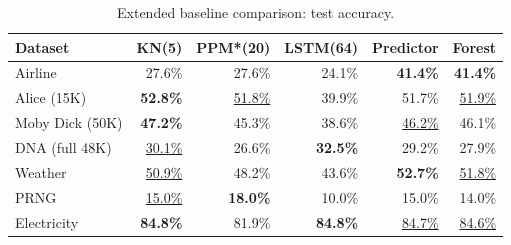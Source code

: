 \begin{table}[h]
\centering
\caption{Extended baseline comparison: test accuracy.}
\label{tab:extended}
\begin{tabular}{lrrrrr}
\toprule
Dataset & KN(5) & PPM*(20) & LSTM(64) & Predictor & Forest \\
\midrule
Airline & 27.6\% & 27.6\% & 24.1\% & \textbf{41.4\%} & \textbf{41.4\%} \\
Alice (15K) & \textbf{52.8\%} & \underline{51.8\%} & 39.9\% & 51.7\% & \underline{51.9\%} \\
Moby Dick (50K) & \textbf{47.2\%} & 45.3\% & 38.6\% & \underline{46.2\%} & 46.1\% \\
DNA (full 48K) & \underline{30.1\%} & 26.6\% & \textbf{32.5\%} & 29.2\% & 27.9\% \\
Weather & \underline{50.9\%} & 48.2\% & 43.6\% & \textbf{52.7\%} & \underline{51.8\%} \\
PRNG & \underline{15.0\%} & \textbf{18.0\%} & 10.0\% & 15.0\% & 14.0\% \\
Electricity & \textbf{84.8\%} & 81.9\% & \textbf{84.8\%} & \underline{84.7\%} & \underline{84.6\%} \\
\bottomrule
\end{tabular}
\end{table}
